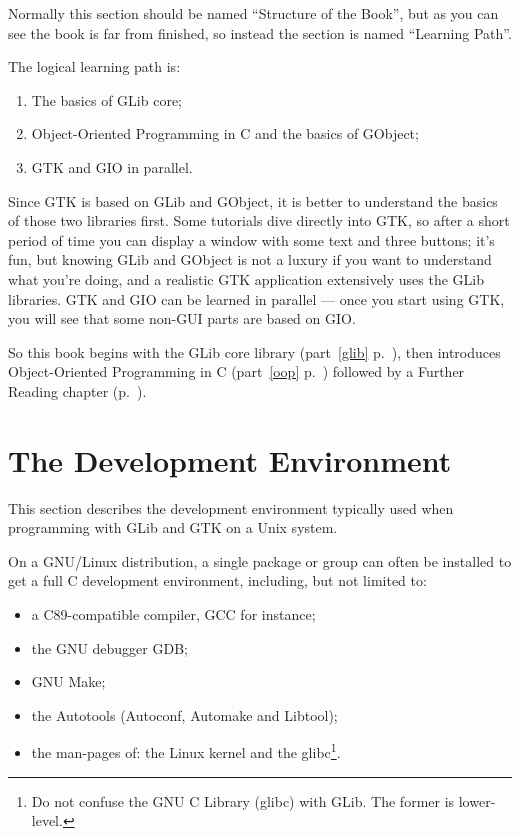 Normally this section should be named ``Structure of the Book'', but as you can see the book is far from finished, so instead the section is named ``Learning Path''.

The logical learning path is:
\begin{enumerate}
  \item The basics of GLib core;
  \item Object-Oriented Programming in C and the basics of GObject;
  \item GTK and GIO in parallel.
\end{enumerate}

Since GTK is based on GLib and GObject, it is better to understand the basics of those two libraries first. Some tutorials dive directly into GTK, so after a short period of time you can display a window with some text and three buttons; it's fun, but knowing GLib and GObject is not a luxury if you want to understand what you're doing, and a realistic GTK application extensively uses the GLib libraries. GTK and GIO can be learned in parallel --- once you start using GTK, you will see that some non-GUI parts are based on GIO.

So this book begins with the GLib core library (part~\ref{glib} p.~\pageref{glib}), then introduces Object-Oriented Programming in C (part~\ref{oop} p.~\pageref{oop}) followed by a Further Reading chapter (p.~\pageref{further-reading}).

\section{The Development Environment}
\label{intro-dev-environment}

This section describes the development environment typically used when programming with GLib and GTK on a Unix system.

On a GNU/Linux distribution, a single package or group can often be installed to get a full C development environment, including, but not limited to:
\begin{itemize}
  \item a C89-compatible compiler, GCC for instance;
  \item the GNU debugger GDB;
  \item GNU Make;
  \item the Autotools (Autoconf, Automake and Libtool);
  \item the man-pages of: the Linux kernel and the glibc\footnote{Do not confuse the GNU C Library (glibc) with GLib. The former is lower-level.}.
\end{itemize}

